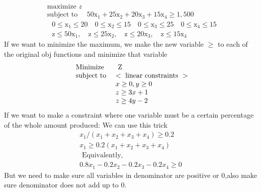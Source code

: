 \documentclass{article}
\begin{document}
$$
\begin{array} { l } { \text { maximize } z } \\ { \text { subject to } \quad 50 \mathrm { x } _ { 1 } + 25 \mathrm { x } _ { 2 } + 20 \mathrm { x } _ { 3 } + 15 \mathrm { x } _ { 4 } \geq 1,500 } \\ { \quad 0 \leq \mathrm { x } _ { 1 } \leq 20 \quad 0 \leq \mathrm { x } _ { 2 } \leq 15 \quad 0 \leq \mathrm { x } _ { 3 } \leq 25 \quad 0 \leq \mathrm { x } _ { 4 } \leq 15 } \\ { \quad \mathrm { z } \leq 50 \mathrm { x } _ { 1 } , \quad \mathrm { z } \leq 25 \mathrm { x } _ { 2 } , \quad \mathrm { z } \leq 20 \mathrm { x } _ { 3 } , \quad \mathrm { z } \leq 15 \mathrm { x } _ { 4 } } \end{array}
$$
If we want to minimize the maximum, we make the new variable $\geq$ to each of the original obj functions and minimize that variable
$$
\begin{array} { l l } { \text { Minimize } } & { \text { Z } } \\ { \text { subject to } } & {< \text { linear constraints } > } \\ { } & { x \geq 0 , y \geq 0 } \\ { } & { z \geq 3 x + 1 } \\ { } & { z \geq 4 y - 2 } \end{array}
$$
If we want to make a constraint where one variable must be a certain percentage of the whole amount produced: We can use this trick
$$
\begin{array} { l } { x _ { 1 } / \left( x _ { 1 } + x _ { 2 } + x _ { 3 } + x _ { 4 } \right) \geq 0.2 } \\ { x _ { 1 } \geq 0.2 \left( x _ { 1 } + x _ { 2 } + x _ { 3 } + x _ { 4 } \right) } \\ { \text { Equivalently, } } \\ { 0.8 x _ { 1 } - 0.2 x _ { 2 } - 0.2 x _ { 3 } - 0.2 x _ { 4 } \geq 0 } \end{array}
$$
But we need to make sure all variables in denominator are positive or 0,also make sure denominator does not add up to 0.\\
\end{document}
